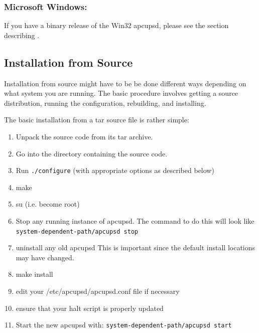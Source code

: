 \label{Microsoft-Windows}

\subsubsection*{Microsoft Windows:}

\label{index-Installing_002c-Microsoft-21}
If you have a binary release of the Win32 apcupsd, please see the section
describing
.

\label{Installation-from-Source}

\subsection*{Installation from Source}

Installation from source might have to be be done different ways depending on
what system you are running. The basic procedure involves getting a source
distribution, running the configuration, rebuilding, and installing.  

The basic installation from a tar source file is rather simple:  

\begin{enumerate}
\item Unpack the source code from its tar archive.  
\item Go into the directory containing the source code.  
\item Run {\tt ./configure} (with appropriate options as described below)  
\item make  
\item su (i.e. become root)  
\item Stop any running instance of apcupsd.  The command to do this will look
   like {\tt \lt{}system-dependent-path\gt{}/apcupsd stop}  
\item uninstall any old apcupsd This is important since the default install
   locations may have changed.  
\item make install  
\item edit your /etc/apcupsd/apcupsd.conf file if necessary  
\item ensure that your halt script is properly updated  
\item Start the new apcupsd with: {\tt \lt{}system-dependent-path\gt{}/apcupsd
   start}  
   \end{enumerate}

